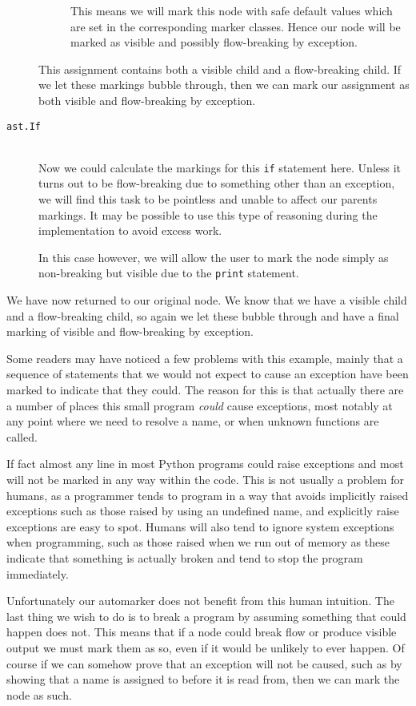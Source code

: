 \documentclass{report}
\begin{document}
\begin{description}
\begin{description}
    This means we will mark this node with safe default values which are set in the corresponding marker classes. Hence our node will be marked
    as visible and possibly flow-breaking by exception.
  \end{description}
  This assignment contains both a visible child and a flow-breaking child. If we let these markings bubble through, then we can mark our assignment
  as both visible and flow-breaking by exception. 

  \item[\texttt{ast.If}] \hfill \\
  Now we could calculate the markings for this \texttt{if} statement here. Unless it turns out to be flow-breaking due to something other than an
  exception, we will find this task to be pointless and unable to affect our parents markings. It may be possible to use this type of reasoning
  during the implementation to avoid excess work.

  In this case however, we will allow the user to mark the node simply as non-breaking but visible due to the \texttt{print} statement.
\end{description}

We have now returned to our original node. We know that we have a visible child and a flow-breaking child, so again we let these bubble through
and have a final marking of visible and flow-breaking by exception.

Some readers may have noticed a few problems with this example, mainly that a sequence of statements that we would not expect to cause an exception
have been marked to indicate that they could. The reason for this is that actually there are a number of places this small program \textit{could} cause
exceptions, most notably at any point where we need to resolve a name, or when unknown functions are called.

If fact almost any line in most Python programs could raise exceptions and most will not be marked in any way within the code. This is not usually a
problem for humans, as a programmer tends to program in a way that avoids implicitly raised exceptions such as those raised by using an undefined name,
and explicitly raise exceptions are easy to spot. Humans will also tend to ignore system exceptions when programming, such as those raised when we run
out of memory as these indicate that something is actually broken and tend to stop the program immediately.

Unfortunately our automarker does not benefit from this human intuition. The last thing we wish to do is to break a program by assuming something that
could happen does not. This means that if a node could break flow or produce visible output we must mark them as so, even if it would be unlikely to ever
happen. Of course if we can somehow prove that an exception will not be caused, such as by showing that a name is assigned to before it is read from,
then we can mark the node as such.
\end{document}
